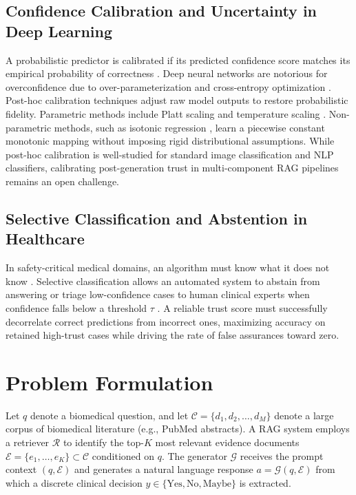 \documentclass[journal,10pt]{IEEEtran}
\begin{document}
\subsection{Confidence Calibration and Uncertainty in Deep Learning}
A probabilistic predictor is calibrated if its predicted confidence score matches its empirical probability of correctness \cite{guo2017calibration, naeini2015obtaining}. Deep neural networks are notorious for overconfidence due to over-parameterization and cross-entropy optimization \cite{guo2017calibration}. Post-hoc calibration techniques adjust raw model outputs to restore probabilistic fidelity. Parametric methods include Platt scaling \cite{platt1999probabilistic} and temperature scaling \cite{guo2017calibration}. Non-parametric methods, such as isotonic regression \cite{zadrozny2002transforming}, learn a piecewise constant monotonic mapping without imposing rigid distributional assumptions. While post-hoc calibration is well-studied for standard image classification and NLP classifiers, calibrating post-generation trust in multi-component RAG pipelines remains an open challenge.

\subsection{Selective Classification and Abstention in Healthcare}
In safety-critical medical domains, an algorithm must know what it does not know \cite{geifman2017selective, leibig2017leveraging}. Selective classification allows an automated system to abstain from answering or triage low-confidence cases to human clinical experts when confidence falls below a threshold $\tau$ \cite{bartlett2008classification, mozannar2020consistent}. A reliable trust score must successfully decorrelate correct predictions from incorrect ones, maximizing accuracy on retained high-trust cases while driving the rate of false assurances toward zero.

\section{Problem Formulation}
Let $q$ denote a biomedical question, and let $\mathcal{C} = \{d_1, d_2, \dots, d_M\}$ denote a large corpus of biomedical literature (e.g., PubMed abstracts). A RAG system employs a retriever $\mathcal{R}$ to identify the top-$K$ most relevant evidence documents $\mathcal{E} = \{e_1, \dots, e_K\} \subset \mathcal{C}$ conditioned on $q$. The generator $\mathcal{G}$ receives the prompt context $(q, \mathcal{E})$ and generates a natural language response $a = \mathcal{G}(q, \mathcal{E})$ from which a discrete clinical decision $\hat{y} \in \{\text{Yes}, \text{No}, \text{Maybe}\}$ is extracted.
\end{document}
